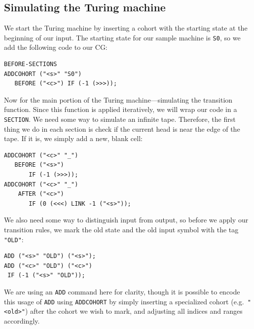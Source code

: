 \documentclass[11pt]{article}
\def\t#1{\texttt{#1}}
\begin{document}
\subsection{Simulating the Turing machine}
We start the Turing machine by inserting a cohort with the starting state at the
beginning of our input. The starting state for our sample machine is \t{S0}, so
we add the following code to our CG:
\begin{Verbatim}
BEFORE-SECTIONS
ADDCOHORT ("<s>" "S0") 
   BEFORE ("<c>") IF (-1 (>>>));
\end{Verbatim}
Now for the main portion of the Turing machine---simulating the transition 
function. Since this function is applied iteratively, we will wrap our code in a
\t{SECTION}.
We need some way to simulate an infinite tape. Therefore, the first thing we do
in each section is check if the current head is near the edge of the tape. If it
is, we simply add a new, blank cell:
\begin{Verbatim}
ADDCOHORT ("<c>" "_")
   BEFORE ("<s>")
       IF (-1 (>>>));
ADDCOHORT ("<c>" "_") 
    AFTER ("<c>")
       IF (0 (<<<) LINK -1 ("<s>"));
\end{Verbatim}
We also need some way to distinguish input from output, so before we apply our
transition rules, we mark the old state and the old input symbol with the tag
\t{"OLD"}: 
\begin{Verbatim}
ADD ("<s>" "OLD") ("<s>");
ADD ("<c>" "OLD") ("<c>")
 IF (-1 ("<s>" "OLD"));
\end{Verbatim}
We are using an \t{ADD} command here for clarity, though it is possible to
encode this usage of \t{ADD} using \t{ADDCOHORT} by simply inserting a
specialized cohort (e.g.\ \t{"<old>"}) after the cohort we wish to mark, and
adjusting all indices and ranges accordingly.
\end{document}

